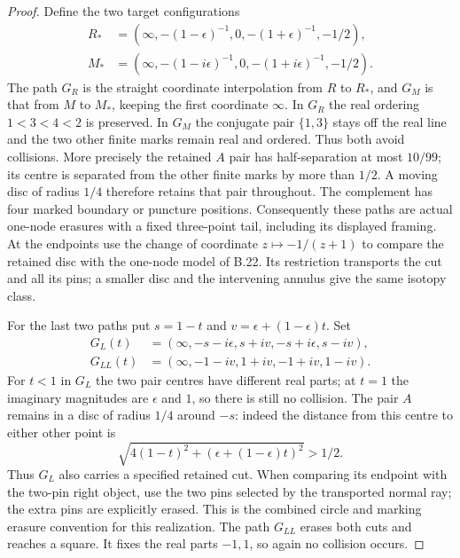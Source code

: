 \begin{proof}
Define the two target configurations
\[
\begin{aligned}
 R_*&=(\infty,-(1-\epsilon)^{-1},0,
                 -(1+\epsilon)^{-1},-1/2),\\
 M_*&=(\infty,-(1-i\epsilon)^{-1},0,
                 -(1+i\epsilon)^{-1},-1/2).
\end{aligned}                                                     \tag{B.57}
\]
The path $G_R$ is the straight coordinate interpolation
from $R$ to $R_*$, and $G_M$ is that from $M$ to $M_*$,
keeping the first coordinate $\infty$.  In $G_R$ the real
ordering $1<3<4<2$ is preserved.  In $G_M$ the conjugate
pair $\{1,3\}$ stays off the real line and the two other
finite marks remain real and ordered.  Thus both avoid
collisions.  More precisely the retained $A$ pair has
half-separation at most $10/99$; its centre is separated
from the other finite marks by more than $1/2$.  A moving
disc of radius $1/4$ therefore retains that pair throughout.
The complement has four marked boundary or puncture positions.
Consequently these paths are actual one-node erasures with
a fixed three-point tail, including its displayed framing.
At the endpoints use the change of coordinate $z\mapsto
-1/(z+1)$ to compare the retained disc with the one-node
model of B.22.  Its restriction transports the cut and all
its pins; a smaller disc and the intervening annulus give
the same isotopy class.

For the last two paths put $s=1-t$ and
$v=\epsilon+(1-\epsilon)t$.  Set
\[
\begin{aligned}
 G_L(t)&=(\infty,-s-i\epsilon,s+iv,-s+i\epsilon,s-iv),\\
 G_{LL}(t)&=(\infty,-1-iv,1+iv,-1+iv,1-iv).
\end{aligned}                                                     \tag{B.58}
\]
For $t<1$ in $G_L$ the two pair centres have different
real parts; at $t=1$ the imaginary magnitudes are
$\epsilon$ and $1$, so there is still no collision.
The pair $A$ remains in a disc of radius $1/4$ around
$-s$: indeed the distance from this centre to either
other point is
\[
 \sqrt{4(1-t)^2+(\epsilon+(1-\epsilon)t)^2}>1/2.
\]
Thus $G_L$ also carries a specified retained cut.  When
comparing its endpoint with the two-pin right object, use
the two pins selected by the transported normal ray;
the extra pins are explicitly erased.  This is the combined
circle and marking erasure convention for this realization.
The path $G_{LL}$ erases both cuts and reaches a square.
It fixes the real parts $-1,1$, so again no collision occurs.


\end{proof}
